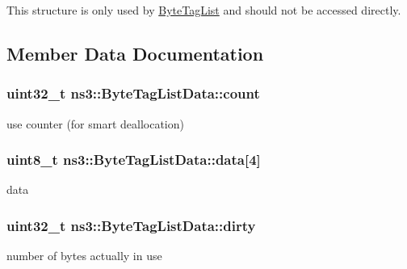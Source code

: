 This structure is only used by \hyperlink{classns3_1_1ByteTagList}{Byte\+Tag\+List} and should not be accessed directly. 

\subsection{Member Data Documentation}
\subsubsection[{\texorpdfstring{count}{count}}]{\setlength{\rightskip}{0pt plus 5cm}uint32\+\_\+t ns3\+::\+Byte\+Tag\+List\+Data\+::count}\hypertarget{structns3_1_1ByteTagListData_ad988d414af9ffa6c08db7deec4111a5d}{}\label{structns3_1_1ByteTagListData_ad988d414af9ffa6c08db7deec4111a5d}


use counter (for smart deallocation) 

\subsubsection[{\texorpdfstring{data}{data}}]{\setlength{\rightskip}{0pt plus 5cm}uint8\+\_\+t ns3\+::\+Byte\+Tag\+List\+Data\+::data\mbox{[}4\mbox{]}}\hypertarget{structns3_1_1ByteTagListData_ada0659d129ba8de66119d4445909729c}{}\label{structns3_1_1ByteTagListData_ada0659d129ba8de66119d4445909729c}


data 

\subsubsection[{\texorpdfstring{dirty}{dirty}}]{\setlength{\rightskip}{0pt plus 5cm}uint32\+\_\+t ns3\+::\+Byte\+Tag\+List\+Data\+::dirty}\hypertarget{structns3_1_1ByteTagListData_a1fa089d3d62fdd4c653ab17e57a9eb42}{}\label{structns3_1_1ByteTagListData_a1fa089d3d62fdd4c653ab17e57a9eb42}


number of bytes actually in use 

